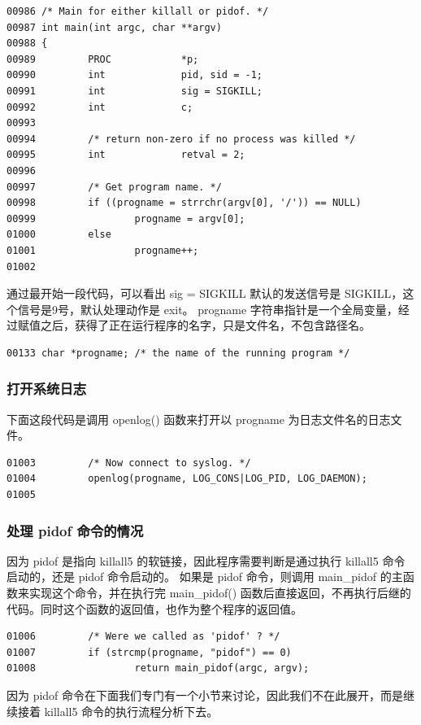 {\begin{shaded}\begin{verbatim}
00986 /* Main for either killall or pidof. */
00987 int main(int argc, char **argv)
00988 {
00989         PROC            *p;
00990         int             pid, sid = -1;
00991         int             sig = SIGKILL;
00992         int             c;
00993 
00994         /* return non-zero if no process was killed */
00995         int             retval = 2;
00996 
00997         /* Get program name. */
00998         if ((progname = strrchr(argv[0], '/')) == NULL)
00999                 progname = argv[0];
01000         else
01001                 progname++;
01002 
\end{verbatim}\end{shaded}}
通过最开始一段代码，可以看出 sig = SIGKILL 默认的发送信号是
SIGKILL，这个信号是9号，默认处理动作是 exit。 progname
字符串指针是一个全局变量，经过赋值之后，获得了正在运行程序的名字，只是文件名，不包含路径名。

{\begin{shaded}\begin{verbatim}
00133 char *progname; /* the name of the running program */
\end{verbatim}\end{shaded}}
\subsubsection{打开系统日志}

下面这段代码是调用 openlog() 函数来打开以 progname
为日志文件名的日志文件。

{\begin{shaded}\begin{verbatim}
01003         /* Now connect to syslog. */
01004         openlog(progname, LOG_CONS|LOG_PID, LOG_DAEMON);
01005 
\end{verbatim}\end{shaded}}
\subsubsection{处理 pidof 命令的情况}

因为 pidof 是指向 killall5 的软链接，因此程序需要判断是通过执行 killall5
命令启动的，还是 pidof 命令启动的。 如果是 pidof 命令，则调用 main\_pidof
的主函数来实现这个命令，并在执行完 main\_pidof()
函数后直接返回，不再执行后继的代码。同时这个函数的返回值，也作为整个程序的返回值。

{\begin{shaded}\begin{verbatim}
01006         /* Were we called as 'pidof' ? */
01007         if (strcmp(progname, "pidof") == 0)
01008                 return main_pidof(argc, argv);
\end{verbatim}\end{shaded}}
因为 pidof
命令在下面我们专门有一个小节来讨论，因此我们不在此展开，而是继续接着
killall5 命令的执行流程分析下去。

